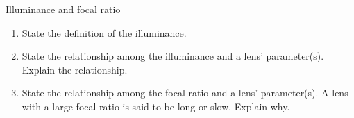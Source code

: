 \documentclass[main.tex]{subfiles}
\begin{document}
\begin{q}{6}
Illuminance and focal ratio
\begin{enumerate}[label=\text{(\alph*)}]
    \item State the definition of the illuminance.
    \item State the relationship among the illuminance and a lens' parameter(s).
    Explain the relationship.
    \item State the relationship among the focal ratio and a lens' parameter(s).
    A lens with a large focal ratio is said to be long or slow. Explain why.
\end{enumerate}
\end{q}

\begin{sol}
\begin{subsol}

\end{subsol}

\begin{subsol}

\end{subsol}

\begin{subsol}
    
\end{subsol}
\end{sol}
\end{document}
